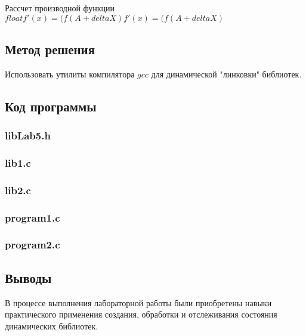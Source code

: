 \documentclass[12pt]{article}
\begin{document}
	Рассчет производной функции	$float f'(x) = (f(A + deltaX) 	f'(x) = (f(A + deltaX)$
	
	\subsection*{Метод решения}
	
	Использовать утилиты компилятора $gcc$ для динамической "линковки" библиотек.
	
	\subsection*{Код программы}
	
	\subsubsection*{libLab5.h}
	
	
	
	\subsubsection*{lib1.c}
	
	
	
	\subsubsection*{lib2.c}
	
	
	
	\subsubsection*{program1.c}
	
	
	
	\subsubsection*{program2.c}
	
	
	
	\subsection*{Выводы}
	
	В процессе выполнения лабораторной работы были приобретены навыки практического применения создания, обработки и отслеживания состояния динамических библиотек.
	
\end{document}
